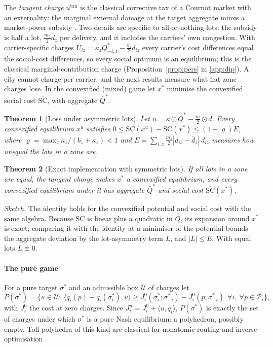 \documentclass[preprint,12pt]{elsarticle}
\newtheorem{theorem}{Theorem}
\theoremstyle{definition}
\theoremstyle{remark}
\newcommand{\ip}[2]{\langle #1,#2\rangle}
\begin{document}
The \emph{tangent charge} $u^{\tan}$ is the classical corrective tax of a Cournot market with an externality: the marginal external damage at the target aggregate minus a market-power subsidy \citep{Buchanan1969,Barnett1980}. Two details are specific to all-or-nothing lots: the subsidy is half a lot, $\tfrac{m_z}{2}\bar d_z$ per delivery, and it includes the carriers' own congestion. With carrier-specific charges $U_{iz}=\kappa_zQ^*_{-i,z}-\tfrac{b_z}{2}d_{iz}$ every carrier's cost differences equal the social-cost differences, so every social optimum is an equilibrium; this is the classical marginal-contribution charge \citep{Wolpert2001,Marden2013} (Proposition~\ref{prop:pers} in \ref{app:dip}). A city cannot charge per carrier, and the next results measure what flat zone charges lose. In the convexified (mixed) game let $x^*$ minimise the convexified social cost $\overline{\mathrm{SC}}$, with aggregate $\bar Q^*$.

\begin{theorem}[Loss under asymmetric lots]\label{thm:asym}
Let $u=\kappa\odot\bar Q^*-\tfrac m2\odot\bar d$. Every convexified equilibrium $x^u$ satisfies $0\le\overline{\mathrm{SC}}(x^u)-\overline{\mathrm{SC}}(x^*)\le(1+\varrho)E$, where $\varrho=\max_z\kappa_z/(b_z+\kappa_z)<1$ and $E=\sum_{i,z}\tfrac{m_z}{2}|d_{iz}-\bar d_z|\,d_{iz}$ measures how unequal the lots in a zone are.
\end{theorem}

\begin{theorem}[Exact implementation with symmetric lots]\label{thm:convex}
If all lots in a zone are equal, the tangent charge makes $x^*$ a convexified equilibrium, and every convexified equilibrium under it has aggregate $\bar Q^*$ and social cost $\overline{\mathrm{SC}}(x^*)$.
\end{theorem}

\emph{Sketch.} The identity holds for the convexified potential and social cost with the same algebra. Because $\overline{\mathrm{SC}}$ is linear plus a quadratic in $\bar Q$, its expansion around $x^*$ is exact; comparing it with the identity at a minimiser of the potential bounds the aggregate deviation by the lot-asymmetry term $L$, and $|L|\le E$. With equal lots $L\equiv0$.

\paragraph{The pure game} For a pure target $\sigma^*$ and an admissible box $\mathcal U$ of charges let
\[
P(\sigma^*)=\big\{u\in\mathcal U:\ \ip{q_i(p)-q_i(\sigma^*_i)}{u}\ge J^0_i(\sigma^*_i;\sigma^*_{-i})-J^0_i(p;\sigma^*_{-i})\ \ \forall i,\ \forall p\in\mathcal P_i\big\},
\]
with $J^0_i$ the cost at zero charges. Since $J^u_i=J^0_i+\ip{u}{q_i}$, $P(\sigma^*)$ is exactly the set of charges under which $\sigma^*$ is a pure Nash equilibrium: a polyhedron, possibly empty. Toll polyhedra of this kind are classical for nonatomic routing \citep{Bergendorff1997,Hearn1998} and inverse optimisation \citep{Ahuja2001}.
\end{document}
